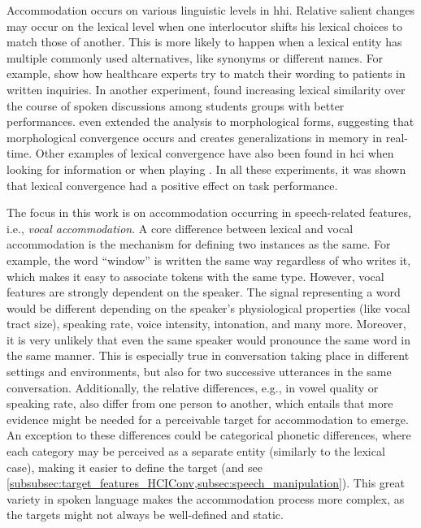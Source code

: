 Accommodation occurs on various linguistic levels in \ac{hhi}.
Relative salient changes may occur on the lexical level when one interlocutor shifts his lexical choices to match those of another.
This is more likely to happen when a lexical entity has multiple commonly used alternatives, like synonyms or different names.
For example, \citet{Jucks2008lexical} show how healthcare experts try to match their wording to patients in written inquiries.
In another experiment, \citet{Friedberg2012lexical} found increasing lexical similarity over the course of spoken discussions among students groups with better performances.
\citet{Racz2020morphological} even extended the analysis to morphological forms, suggesting that morphological convergence occurs and creates generalizations in memory in real-time.
Other examples of lexical convergence have also been found in \ac{hci} when looking for information \citep{Lopes2013lexical} or when playing \citep[][and see \cref{subsec:previous_work}]{Bergqvist2020nontrivial}.
In all these experiments, it was shown that lexical convergence had a positive effect on task performance.

The focus in this work is on accommodation occurring in speech-related features, i.e., \emph{vocal accommodation}.
A core difference between lexical and vocal accommodation is the mechanism for defining two instances as the same.
For example, the word \enquote{window} is written the same way regardless of who writes it, which makes it easy to associate tokens with the same type.
However, vocal features are strongly dependent on the speaker.
The signal representing a word would be different depending on the speaker's physiological properties (like vocal tract size), speaking rate, voice intensity, intonation, and many more.
Moreover, it is very unlikely that even the same speaker would pronounce the same word in the same manner.
This is especially true in conversation taking place in different settings and environments, but also for two successive utterances in the same conversation.
Additionally, the relative differences, e.g., in vowel quality or speaking rate, also differ from one person to another, which entails that more evidence might be needed for a perceivable target for accommodation to emerge.
An exception to these differences could be categorical phonetic differences, where each category may be perceived as a separate entity (similarly to the lexical case), making it easier to define the target (and see \cref{subsubsec:target_features_HCIConv,subsec:speech_manipulation}).
This great variety in spoken language makes the accommodation process more complex, as the targets might not always be well-defined and static.

